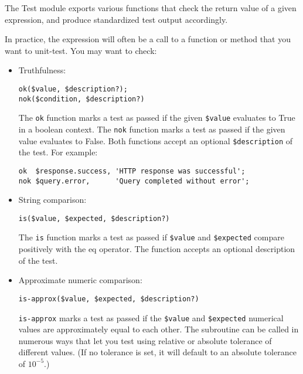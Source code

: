 The Test module exports various functions that check the return 
value of a given expression, and produce standardized test 
output accordingly.

In practice, the expression will often be a call to a function 
or method that you want to unit-test. You may want to check:

\begin{itemize}
\item Truthfulness: 
\begin{verbatim}
ok($value, $description?); 
nok($condition, $description?)
\end{verbatim}

The {\tt ok} function marks a test as passed if the given 
\verb'$value' evaluates to True in a boolean context. The 
{\tt nok} function marks a test as passed if the given value 
evaluates to False. Both functions accept an optional 
\verb'$description' of the test. For example:

\begin{verbatim}
ok  $response.success, 'HTTP response was successful';
nok $query.error,      'Query completed without error';
\end{verbatim}

\item String comparison:
\begin{verbatim}
is($value, $expected, $description?)
\end{verbatim}

The {\tt is} function marks a test as passed if \verb'$value' 
and \verb'$expected' compare positively with the eq operator. 
The function accepts an optional description of the test.

\item Approximate numeric comparison:

\begin{verbatim}
is-approx($value, $expected, $description?)
\end{verbatim}

{\tt is-approx} marks a test as passed if the \verb'$value' and 
\verb'$expected' numerical values are approximately equal 
to each other. The subroutine can be called in numerous ways 
that let you test using relative or absolute tolerance 
of different values. (If no tolerance is set, it will default 
to an absolute tolerance of $10^{-5}$.)


\end{itemize}
